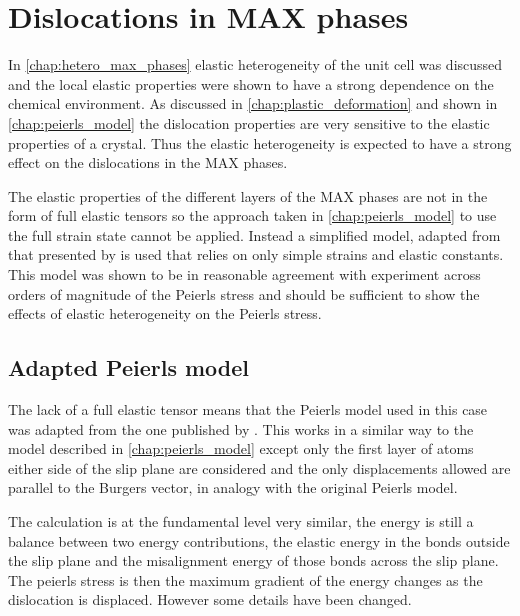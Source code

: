 
\chapter{Dislocations in MAX phases}

\label{chap:dislocations_in_max_phases}
\graphicspath{{dislocations_in_max_phases/Figs/}}






In \autoref{chap:hetero_max_phases} elastic heterogeneity of the unit cell was discussed and the local elastic properties were shown to have a strong dependence on the chemical environment. As discussed in  \autoref{chap:plastic_deformation} and shown in \autoref{chap:peierls_model} the dislocation properties are very sensitive to the elastic properties of a crystal. Thus the elastic heterogeneity is expected to have a strong effect on the dislocations in the MAX phases.

The elastic properties of the different layers of the MAX phases are not in the form of full elastic tensors so the approach taken in \autoref{chap:peierls_model} to use the full strain state cannot be applied. Instead a simplified model, adapted from that presented by \citet{Clegg2006} is used that relies on only simple strains and elastic constants. This model was shown to be in reasonable agreement with experiment across orders of magnitude of the Peierls stress and should be sufficient to show the effects of elastic heterogeneity on the Peierls stress.


\section{Adapted Peierls model}

The lack of a full elastic tensor means that the Peierls model used in this case was adapted from the one published by \cite{Clegg2006}. This works in a similar way to the model described in \autoref{chap:peierls_model} except only the first layer of atoms either side of the slip plane are considered and the only displacements allowed are parallel to the Burgers vector, in analogy with the original Peierls model.

The calculation is at the fundamental level very similar, the energy is still a balance between two energy contributions, the elastic energy in the bonds outside the slip plane and the misalignment energy of those bonds across the slip plane. The peierls stress is then the maximum gradient of the energy changes as the dislocation is displaced. However some details have been changed.


